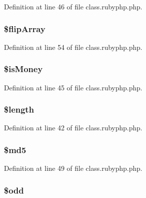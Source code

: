 Definition at line 46 of file class.\-rubyphp.\-php.

\hypertarget{classr_a530c822a487ad325618509d8bf48553a}{
\subsubsection[{\$flip\-Array}]{\setlength{\rightskip}{0pt plus 5cm}\$flip\-Array}}\label{classr_a530c822a487ad325618509d8bf48553a}


Definition at line 54 of file class.\-rubyphp.\-php.

\hypertarget{classr_aa2f5c87cc7b1ab41965e940d5c1406d9}{
\subsubsection[{\$is\-Money}]{\setlength{\rightskip}{0pt plus 5cm}\$is\-Money}}\label{classr_aa2f5c87cc7b1ab41965e940d5c1406d9}


Definition at line 45 of file class.\-rubyphp.\-php.

\hypertarget{classr_adf14d8e29912c1855022dfa252aa4087}{
\subsubsection[{\$length}]{\setlength{\rightskip}{0pt plus 5cm}\${\bf length}}}\label{classr_adf14d8e29912c1855022dfa252aa4087}


Definition at line 42 of file class.\-rubyphp.\-php.

\hypertarget{classr_a2557b214f57a046187b88572e443da1f}{
\subsubsection[{\$md5}]{\setlength{\rightskip}{0pt plus 5cm}\${\bf md5}}}\label{classr_a2557b214f57a046187b88572e443da1f}


Definition at line 49 of file class.\-rubyphp.\-php.

\hypertarget{classr_aee2d4fa4e98da4e6ad23bee644ab5e7a}{
\subsubsection[{\$odd}]{\setlength{\rightskip}{0pt plus 5cm}\${\bf odd}}}\label{classr_aee2d4fa4e98da4e6ad23bee644ab5e7a}


